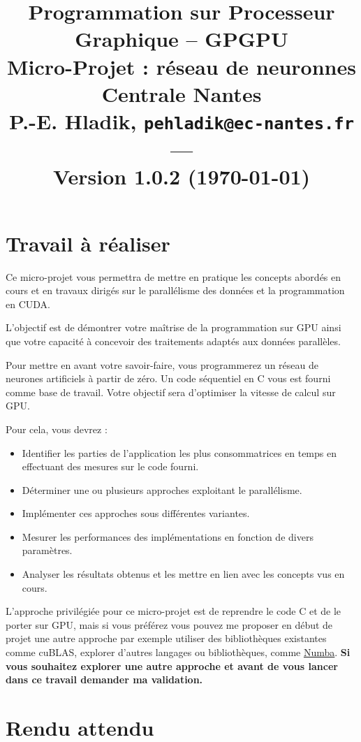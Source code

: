 \documentclass[11pt]{paper}
\title{{\Large Programmation sur Processeur Graphique -- GPGPU }\\
\vspace{-0.4em}
{\large Micro-Projet : réseau de neuronnes}\\
{\small Centrale Nantes}\\
\small P.-E. Hladik, \small{\texttt{pehladik@ec-nantes.fr}}\\
---\\
{\scriptsize  Version 1.0.2 (\today)}\\
}
\begin{document}
\maketitle

  \section*{Travail à réaliser}

Ce micro-projet vous permettra de mettre en pratique les concepts abordés en cours et en travaux dirigés sur le parallélisme des données et la programmation en CUDA.

L'objectif est de démontrer votre maîtrise de la programmation sur GPU ainsi que votre capacité à concevoir des traitements adaptés aux données parallèles.

Pour mettre en avant votre savoir-faire, vous programmerez un réseau de neurones artificiels à partir de zéro. Un code séquentiel en C vous est fourni comme base de travail. Votre objectif sera d’optimiser la vitesse de calcul sur GPU.
\medskip

Pour cela, vous devrez :
\begin{itemize}
	\item Identifier les parties de l’application les plus consommatrices en temps en effectuant des mesures sur le code fourni.
	\item Déterminer une ou plusieurs approches exploitant le parallélisme.
	\item Implémenter ces approches sous différentes variantes.
	\item Mesurer les performances des implémentations en fonction de divers paramètres.
	\item Analyser les résultats obtenus et les mettre en lien avec les concepts vus en cours.
\end{itemize}
\medskip

L'approche privilégiée pour ce micro-projet est de reprendre le code C et de le porter sur GPU, mais si vous préférez vous pouvez me proposer en début de projet une autre approche par exemple utiliser des bibliothèques existantes comme cuBLAS, explorer d'autres langages ou bibliothèques, comme \href{https://numba.readthedocs.io/en/stable/}{Numba}. {\bf Si vous souhaitez explorer une autre approche et avant de vous lancer dans ce travail demander ma validation.}

  \section*{Rendu attendu}
\end{document}
